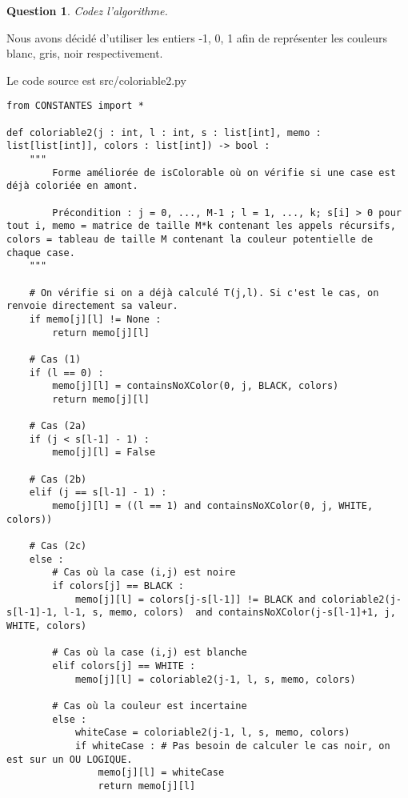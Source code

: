 \documentclass[a4paper,12pt]{article}
\newtheorem{exo}{Question}
\begin{document}



\begin{exo}
	Codez l'algorithme.
\end{exo}

Nous avons décidé d'utiliser les entiers -1, 0, 1 afin de représenter les couleurs blanc, gris, noir respectivement.\par
Le code source est src/coloriable2.py\par

\newpage

\begin{lstlisting}
from CONSTANTES import *

def coloriable2(j : int, l : int, s : list[int], memo : list[list[int]], colors : list[int]) -> bool :
    """
        Forme améliorée de isColorable où on vérifie si une case est déjà coloriée en amont.
    
        Précondition : j = 0, ..., M-1 ; l = 1, ..., k; s[i] > 0 pour tout i, memo = matrice de taille M*k contenant les appels récursifs, colors = tableau de taille M contenant la couleur potentielle de chaque case.
    """
        
    # On vérifie si on a déjà calculé T(j,l). Si c'est le cas, on renvoie directement sa valeur.
    if memo[j][l] != None :
        return memo[j][l]
    
    # Cas (1)
    if (l == 0) :
        memo[j][l] = containsNoXColor(0, j, BLACK, colors)
        return memo[j][l]

    # Cas (2a)
    if (j < s[l-1] - 1) :
        memo[j][l] = False
        
    # Cas (2b)
    elif (j == s[l-1] - 1) :
        memo[j][l] = ((l == 1) and containsNoXColor(0, j, WHITE, colors))
    
    # Cas (2c)  
    else :
        # Cas où la case (i,j) est noire
        if colors[j] == BLACK :
            memo[j][l] = colors[j-s[l-1]] != BLACK and coloriable2(j-s[l-1]-1, l-1, s, memo, colors)  and containsNoXColor(j-s[l-1]+1, j, WHITE, colors)
            
        # Cas où la case (i,j) est blanche
        elif colors[j] == WHITE :
            memo[j][l] = coloriable2(j-1, l, s, memo, colors)
            
        # Cas où la couleur est incertaine
        else :
            whiteCase = coloriable2(j-1, l, s, memo, colors)
            if whiteCase : # Pas besoin de calculer le cas noir, on est sur un OU LOGIQUE.
                memo[j][l] = whiteCase
                return memo[j][l]
            

\end{lstlisting}
\end{document}
